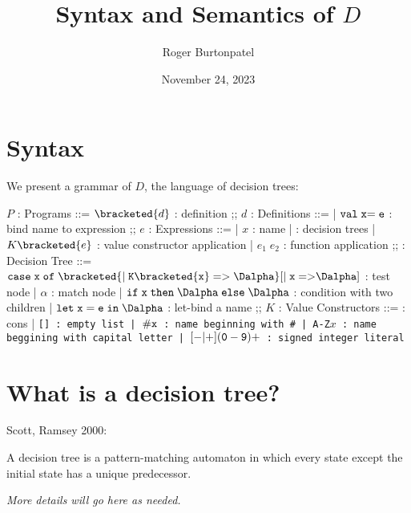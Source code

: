 \documentclass{article}
\title{Syntax and Semantics of $D$}
\author{Roger Burtonpatel}
\date{November 24, 2023}
\begin{document}
\maketitle

\section{Syntax}

We present a grammar of $D$, the language of decision trees: 


\begin{center}
  \begin{bnf}
    $P$ : \textsf{Programs} ::=
    $\bracketed{d}$ : definition
    ;;
    $d$ : \textsf{Definitions} ::=
    | $\tt{val} \; x  \tt{=} \; e$ : bind name to expression
    ;;
    $e$ : \textsf{Expressions} ::=
    | $x$ : name
    | \Dalpha : decision trees 
    | $K \bracketed{e}$ : value constructor application 
    | $e_1 \; e_2$ : function application 
    ;;
    \Dalpha : \textsf{Decision Tree} ::= 
    $\tt{case} \; x \; \tt{of} \; 
    \bracketed{\vert \; K\bracketed{x} \; \tt{=>} \; \Dalpha}
    [\vert \; x \; \tt{=>} \Dalpha]$ : test node 
    | $\alpha$ : match node 
    | $\tt{if} \; x \; \tt{then} \; \Dalpha \; \tt{else} \; \Dalpha$ : condition with two children 
    | $\tt{let} \; x \; \tt{=} \; e \; \tt{in} \; \Dalpha$ : let-bind a name
    ;;
    $K$ : \textsf{Value Constructors} ::=
    \cons : cons 
    | \tt{[]} : empty list 
    | $\tt{\#}x$ : name beginning with \tt{\#}
    | \tt{A-Z}$x$ : name beggining with capital letter
    | $[\tt{-}\vert\tt{+}](\tt{0}-\tt{9})+$ : signed integer literal 
  \end{bnf}
\end{center}

\section{What is a decision tree?}
Scott, Ramsey 2000: 

A decision tree is a pattern-matching automaton in which every state except the
initial state has a unique predecessor. 

\bigskip

\it{More details will go here as needed.}


\end{document}
